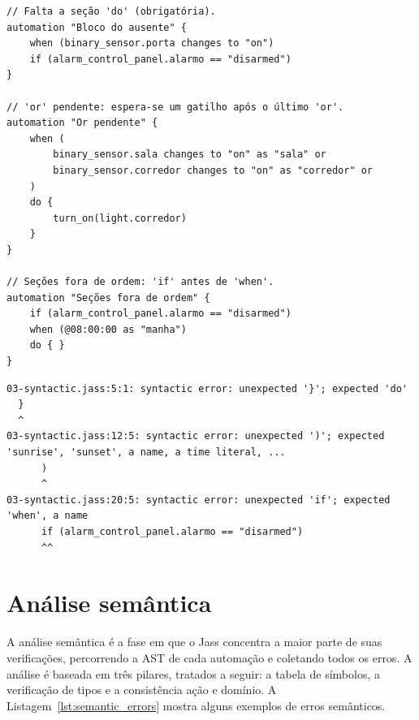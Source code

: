 \documentclass[12pt]{article}
\begin{document}
\begin{listing}[H]
    \centering
    \begin{verbatim}
// Falta a seção 'do' (obrigatória).
automation "Bloco do ausente" {
    when (binary_sensor.porta changes to "on")
    if (alarm_control_panel.alarmo == "disarmed")
}

// 'or' pendente: espera-se um gatilho após o último 'or'.
automation "Or pendente" {
    when (
        binary_sensor.sala changes to "on" as "sala" or
        binary_sensor.corredor changes to "on" as "corredor" or
    )
    do {
        turn_on(light.corredor)
    }
}

// Seções fora de ordem: 'if' antes de 'when'.
automation "Seções fora de ordem" {
    if (alarm_control_panel.alarmo == "disarmed")
    when (@08:00:00 as "manha")
    do { }
}
    \end{verbatim}
    \begin{verbatim}
03-syntactic.jass:5:1: syntactic error: unexpected '}'; expected 'do'
  }
  ^
03-syntactic.jass:12:5: syntactic error: unexpected ')'; expected 'sunrise', 'sunset', a name, a time literal, ...
      )
      ^
03-syntactic.jass:20:5: syntactic error: unexpected 'if'; expected 'when', a name
      if (alarm_control_panel.alarmo == "disarmed")
      ^^
    \end{verbatim}
    \caption{Demonstração de erros sintáticos.}
    \label{lst:syntactic_errors}
\end{listing}

\section{Análise semântica}

A análise semântica é a fase em que o Jass concentra a maior
parte de suas verificações, percorrendo a AST de cada automação e coletando 
todos os erros. A análise é baseada em três pilares, tratados a seguir: a tabela de
símbolos, a verificação de tipos e a consistência ação e domínio. 
A Listagem~\ref{lst:semantic_errors} mostra alguns exemplos de erros semânticos.
\end{document}
